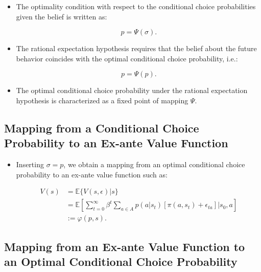 \documentclass[]{book}
\providecommand{\tightlist}{%
  \setlength{\itemsep}{0pt}\setlength{\parskip}{0pt}}
\begin{document}
\begin{itemize}
\tightlist
\item
  The optimality condition with respect to the conditional choice
  probabilities given the belief is written as:

  \begin{equation}
  p = \Psi(\sigma).
  \end{equation}
\item
  The rational expectation hypothesis requires that the belief about the
  future behavior coincides with the optimal conditional choice
  probability, i.e.:

  \begin{equation}
  p = \Psi(p).
  \end{equation}
\item
  The optimal conditional choice probability under the rational
  expectation hypothesis is characterized as a fixed point of mapping
  \(\Psi\).
\end{itemize}

\subsection{Mapping from a Conditional Choice Probability to an Ex-ante
Value
Function}\label{mapping-from-a-conditional-choice-probability-to-an-ex-ante-value-function}

\begin{itemize}
\tightlist
\item
  Inserting \(\sigma = p\), we obtain a mapping from an optimal
  conditional choice probability to an ex-ante value function such as:

  \begin{equation}
  \begin{split}
  V(s) &= \mathbb{E}\{V(s, \epsilon)|s\}\\
  &= \mathbb{E}\left[ \sum_{t = 0}^\infty \beta^t \sum_{a \in A}p(a|s_t)\left[\pi(a, s_t) + \epsilon_{ta}\right]\Bigg|s_0, a\right]\\
  &:= \varphi(p, s).
  \end{split}
  \end{equation}
\end{itemize}

\subsection{Mapping from an Ex-ante Value Function to an Optimal
Conditional Choice
Probability}\label{mapping-from-an-ex-ante-value-function-to-an-optimal-conditional-choice-probability}
\end{document}

